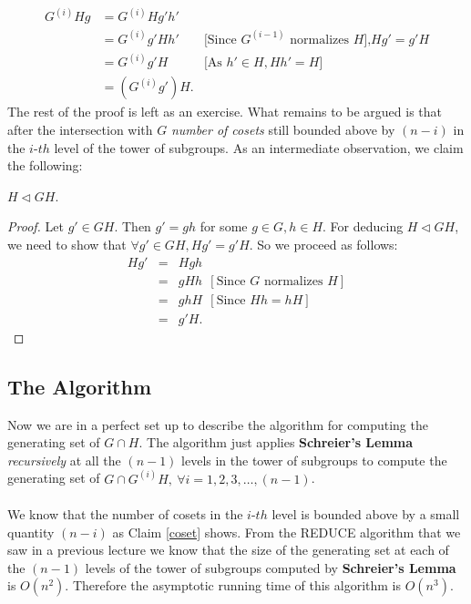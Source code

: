 \begin{eqnarray*}
	G^{(i)}Hg &= G^{(i)}Hg'h'\\
			  &= G^{(i)}g'Hh' & \text{[Since $G^{(i-1)}$ normalizes $H$],$Hg'=g'H$}\\
			  &= G^{(i)}g'H & \text{[As $h'\in H , Hh' = H$]}\\
			  &= (G^{(i)}g')H.
\end{eqnarray*}
The rest of the proof is left as an exercise. What remains to be argued is that after the intersection with $G$ \emph{number of cosets} still bounded above by $(n-i)$ in the $i$-$th$ level of the tower of subgroups. As an intermediate observation, we claim the following:
\begin{claim}
	$H\triangleleft GH$.
\end{claim}
\begin{proof}
	Let $g'\in GH$. Then $g' = gh$ for some $g\in G, h\in H$. For deducing $H\triangleleft GH$, we need to show that $\forall g'\in GH, Hg' = g'H$. So we proceed as follows:
	\begin{eqnarray*}
		Hg' &=& Hgh\\
			&=& gHh~~[\text{Since }G\text{ normalizes }H]\\
			&=& ghH~~[\text{Since }Hh = hH]\\
			&=& g'H.
	\end{eqnarray*}
\end{proof}
\subsection{The Algorithm}
Now we are in a perfect set up to describe the algorithm for computing the generating set of $G\cap H$. The algorithm just applies {\bf Schreier's Lemma} \emph{recursively} at all the $(n-1)$ levels in the tower of subgroups to compute the generating set of $G\cap G^{(i)}H,~\forall i=1,2,3,\ldots,(n-1)$.\\\\We know that the number of cosets in the $i$-$th$ level is bounded above by a small quantity $(n-i)$ as Claim \ref{coset} shows. From the REDUCE algorithm that we saw in a previous lecture we know that the size of the generating set at each of the $(n-1)$ levels of the tower of subgroups computed by {\bf Schreier's Lemma} is $O(n^2)$. Therefore the asymptotic running time of this algorithm is $O(n^3)$.


